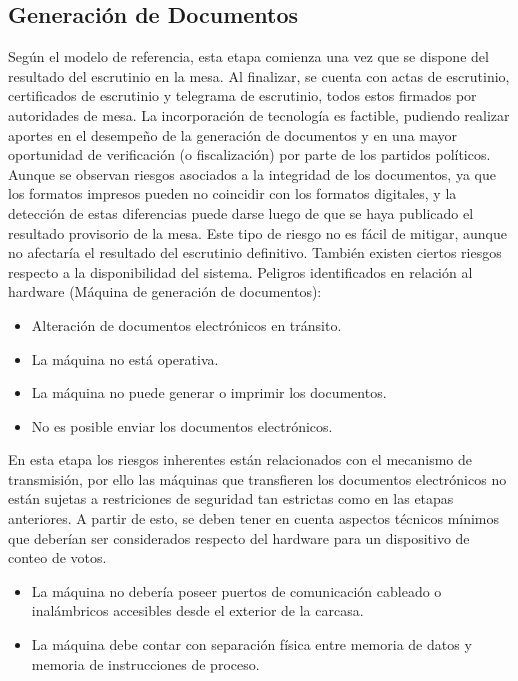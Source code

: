 \subsection{Generación de Documentos} Según el modelo de referencia, esta etapa comienza una vez que se dispone del resultado del escrutinio en la mesa. Al finalizar, se cuenta con actas de escrutinio, certificados de escrutinio y telegrama de escrutinio, todos estos firmados por autoridades de mesa. La incorporación de tecnología es factible, pudiendo realizar aportes en el desempeño de la generación de documentos y en una mayor oportunidad de verificación (o fiscalización) por parte de los partidos políticos. Aunque se observan riesgos asociados a la integridad de los documentos, ya que los formatos impresos pueden no coincidir con los formatos digitales, y la detección de estas diferencias puede darse luego de que se haya publicado el resultado provisorio de la mesa. Este tipo de riesgo no es fácil de mitigar, aunque no afectaría el resultado del escrutinio definitivo. También existen ciertos riesgos respecto a la disponibilidad del sistema.\newline
    Peligros identificados en relación al hardware (Máquina de generación de documentos):
    \begin{itemize}
        \item Alteración de documentos electrónicos en tránsito.
        \item La máquina no está operativa.
        \item La máquina no puede generar o imprimir los documentos.
        \item No es posible enviar los documentos electrónicos.
    \end{itemize}
    En esta etapa los riesgos inherentes están relacionados con el mecanismo de transmisión, por ello las máquinas que transfieren los documentos electrónicos no están sujetas a restriciones de seguridad tan estrictas como en las etapas anteriores.
    A partir de esto, se deben tener en cuenta aspectos técnicos mínimos que deberían ser considerados respecto del hardware para un dispositivo de conteo de votos.
    \begin{itemize}
        \item La máquina no debería poseer puertos de comunicación cableado o inalámbricos accesibles desde el exterior de la carcasa.
        \item La máquina debe contar con separación física entre memoria de datos y memoria de instrucciones de proceso.
     \end{itemize}  
        
